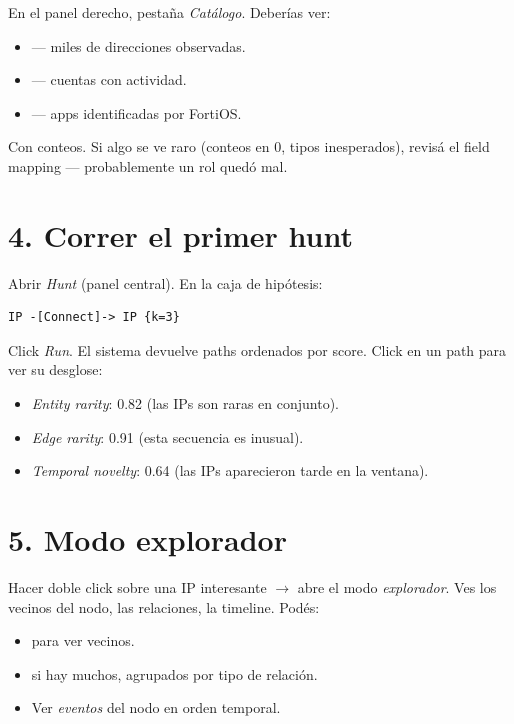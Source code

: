En el panel derecho, pestaña \emph{Catálogo}. Deberías ver:

\begin{itemize}
    \item {} — miles de direcciones observadas.
    \item {} — cuentas con actividad.
    \item {} — apps identificadas por FortiOS.
\end{itemize}

Con conteos. Si algo se ve raro (conteos en 0, tipos inesperados),
revisá el field mapping — probablemente un rol quedó mal.

\section{4. Correr el primer hunt}

Abrir \emph{Hunt} (panel central). En la caja de hipótesis:

\begin{lstlisting}[basicstyle=\ttfamily\small]
IP -[Connect]-> IP {k=3}
\end{lstlisting}

Click \emph{Run}. El sistema devuelve paths ordenados por score.
Click en un path para ver su desglose:

\begin{itemize}
    \item \emph{Entity rarity}: 0.82 (las IPs son raras en conjunto).
    \item \emph{Edge rarity}: 0.91 (esta secuencia es inusual).
    \item \emph{Temporal novelty}: 0.64 (las IPs aparecieron tarde
    en la ventana).
\end{itemize}

\section{5. Modo explorador}

Hacer doble click sobre una IP interesante $\to$ abre el modo
\emph{explorador}. Ves los vecinos del nodo, las relaciones, la
timeline. Podés:

\begin{itemize}
    \item {} para ver vecinos.
    \item {} si hay muchos, agrupados por tipo
    de relación.
    \item Ver \emph{eventos} del nodo en orden temporal.
\end{itemize}

